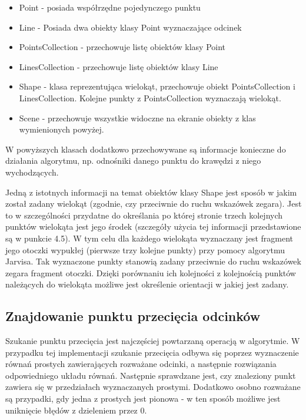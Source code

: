 \documentclass{article}
\begin{document}
\begin{itemize}
\item Point - posiada współrzędne pojedynczego punktu
\item Line - Posiada dwa obiekty klasy Point wyznaczające odcinek
\item PointsCollection - przechowuje listę obiektów klasy Point
\item LinesCollection - przechowuje listę obiektów klasy Line
\item Shape - klasa reprezentująca wielokąt, przechowuje obiekt PointsCollection i LinesCollection. Kolejne punkty z PointsCollection wyznaczają wielokąt.
\item Scene - przechowuje wszystkie widoczne na ekranie
obiekty z klas wymienionych powyżej.
\end{itemize}

\noindent 
W powyższych klasach dodatkowo przechowywane są informacje konieczne do działania algorytmu, np. odnośniki danego punktu do krawędzi z niego wychodzących.

\noindent \qquad Jedną z istotnych informacji na temat obiektów klasy Shape jest sposób w jakim został zadany wielokąt (zgodnie, czy przeciwnie do ruchu wskazówek zegara). Jest to w szczególności przydatne do określania po której stronie trzech kolejnych punktów wielokąta jest jego środek (szczegóły użycia tej informacji przedstawione są w punkcie 4.5). W tym celu dla każdego wielokąta wyznaczany jest fragment jego otoczki wypukłej (pierwsze trzy kolejne punkty) przy pomocy algorytmu Jarvisa. Tak wyznaczone punkty stanowią zadany przeciwnie do ruchu wskazówek zegara fragment otoczki. Dzięki porównaniu ich kolejności z kolejnością punktów należących do wielokąta możliwe jest określenie orientacji w jakiej jest zadany.


\subsection{Znajdowanie punktu przecięcia odcinków}

\qquad Szukanie punktu przecięcia jest najczęściej powtarzaną operacją w algorytmie. W przypadku tej implementacji szukanie przecięcia odbywa się poprzez wyznaczenie równań prostych zawierających rozważane odcinki, a następnie rozwiązania odpowiedniego układu równań. Następnie sprawdzane jest, czy znaleziony punkt zawiera się w przedziałach wyznaczanych prostymi. Dodatkowo osobno rozważane są przypadki, gdy jedna z prostych jest pionowa - w ten sposób możliwe jest uniknięcie błędów z dzieleniem przez 0.
\end{document}
